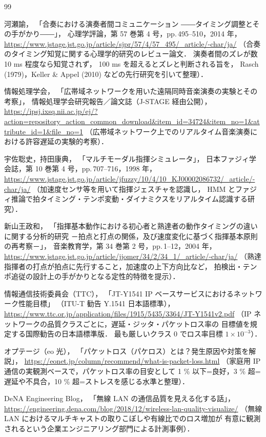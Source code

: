 \documentclass[lualatex,book,paper=a4paper,jafontsize=11.5pt,jafontscale=1.05]{jlreq}
\begin{document}
\begin{thebibliography}{99}

河瀬諭，
「合奏における演奏者間コミュニケーション
――タイミング調整とその手がかり――」，
心理学評論，第 57 巻第 4 号，pp.\,495--510，2014 年，
\url{https://www.jstage.jst.go.jp/article/sjpr/57/4/57_495/_article/-char/ja/}
（合奏のタイミング知覚に関する心理学的研究のレビュー論文．
演奏者間のズレが数 10 ms 程度なら知覚されず，
100 ms を超えるとズレと判断される旨を，
Rasch (1979)，Keller \& Appel (2010) などの先行研究を引いて整理）．

情報処理学会，
「広帯域ネットワークを用いた遠隔同時音楽演奏の実験とその考察」，
情報処理学会研究報告／論文誌（J-STAGE 経由公開），
\url{https://ipsj.ixsq.nii.ac.jp/ej/?action=repository_action_common_download&item_id=34724&item_no=1&attribute_id=1&file_no=1}
（広帯域ネットワーク上でのリアルタイム音楽演奏における許容遅延の実験的考察）．

宇佐聡史，持田康典，
「マルチモーダル指揮シミュレータ」，
日本ファジィ学会誌，第 10 巻第 4 号，pp.\,707--716，1998 年，
\url{https://www.jstage.jst.go.jp/article/jfuzzy/10/4/10_KJ00002086732/_article/-char/ja/}
（加速度センサ等を用いて指揮ジェスチャを認識し，
HMM とファジィ推論で拍タイミング・テンポ変動・ダイナミクスをリアルタイム認識する研究）．

新山王政和，
「指揮基本動作における初心者と熟達者の動作タイミングの違いに関する分析的研究
－拍点と打点の関係，及び速度変化に基づく指揮基本原則の再考察－」，
音楽教育学，第 34 巻第 2 号，pp.\,1--12，2004 年，
\url{https://www.jstage.jst.go.jp/article/jjomer/34/2/34_1/_article/-char/ja/}
（熟達指揮者の打点が拍点に先行すること，加速度の上下方向比など，
拍検出・テンポ追従の設計上の手がかりとなる定性的特徴を提示）．

情報通信技術委員会（TTC），
「JT-Y1541 IP ベースサービスにおけるネットワーク性能目標」
（ITU-T 勧告 Y.1541 日本語標準），
\url{https://www.ttc.or.jp/application/files/1915/5435/3364/JT-Y1541v2.pdf}
（IP ネットワークの品質クラスごとに，遅延・ジッタ・パケットロス率の
目標値を規定する国際勧告の日本語標準版．
最も厳しいクラス 0 でロス率目標 $1\times 10^{-3}$）．

オプテージ（eo 光），
「パケットロス（パケロス）とは？発生原因や対策を解説」，
\url{https://eonet.jp/column/recommend/what-is-packet-loss.html}
（家庭用 IP 通信の実観測ベースで，パケットロス率の目安として
1 \% 以下=良好，3 \% 超=遅延や不具合，10 \% 超=ストレスを感じる水準と整理）．

DeNA Engineering Blog，
「無線 LAN の通信品質を見える化する話」，
\url{https://engineering.dena.com/blog/2018/12/wireless-lan-quality-visualize/}
（無線 LAN におけるマルチキャストの取りこぼしや有線比でのロス増加が
有意に観測されるという企業エンジニアリング部門による計測事例）．

\end{thebibliography}
\end{document}
